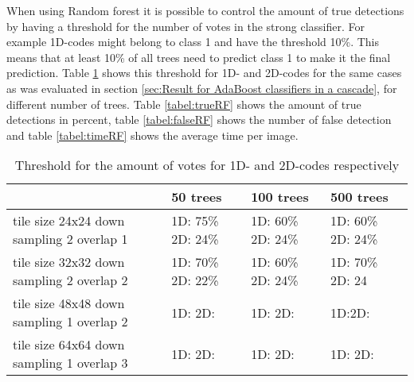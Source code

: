 When using Random forest it is possible to control the amount of true detections by having a threshold for the number of votes in the strong classifier. For example 1D-codes might belong to class 1 and have the threshold 10\%. This means that at least 10\% of all trees need to predict class 1 to make it the final prediction. Table \ref{table:thresholdRandomForest} shows this threshold for 1D- and 2D-codes for the same cases as was evaluated in section \ref{sec:Result for AdaBoost classifiers in a cascade}, for different number of trees. Table \ref{tabel:trueRF} shows the amount of true detections in percent, table \ref{tabel:falseRF} shows the number of false detection and table \ref{tabel:timeRF} shows the average time per image. 

\begin{table}[H]
\begin{center}
     \begin{tabular}{ | p{3cm} | p{2cm} | p{2cm} | p{2cm}|}
     \hline
      	& 50 trees & 100 trees & 500 trees \\ \hline
   	 tile size 24x24 \newline down sampling 2 \newline overlap 1 &
   1D: 75\% \newline 2D: 24\% & 1D: 60\% \newline 2D: 24\% & 1D: 60\% \newline 2D: 24\%  				\\ \hline
     tile size 32x32 \newline down sampling 2 \newline overlap 2 &
    1D: 70\% \newline 2D: 22\% & 1D: 60\% \newline 2D: 24\%  & 1D: 70\% \newline 2D: 		24 	 \\ \hline
     tile size 48x48 \newline down sampling 1 \newline overlap 2 
     & 1D: \newline 2D: & 1D: \newline 2D:  & 1D:\newline 2D: 
     \\ \hline
     tile size 64x64 \newline down sampling 1 \newline overlap 3 
     & 1D: \newline 2D: & 1D:  \newline 2D:  & 1D:  \newline 2D: 		 \\ \hline
     \end{tabular}
\end{center}
\caption{Threshold for the amount of votes for 1D- and 2D-codes respectively}
\label{table:thresholdRandomForest}
\end{table}

